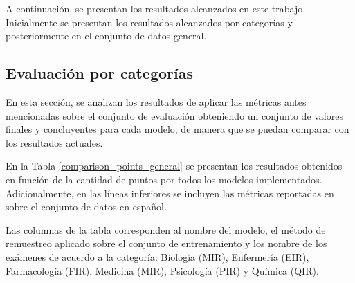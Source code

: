 A continuación, se presentan los resultados alcanzados en este trabajo. Inicialmente se presentan los resultados alcanzados por categorías y posteriormente en el conjunto de datos general.

\subsection{Evaluación por categorías}

En esta sección, se analizan los resultados de aplicar las métricas antes mencionadas sobre el conjunto de evaluación obteniendo un conjunto de valores finales y concluyentes para cada modelo, de manera que se puedan comparar con los resultados actuales. 

En la Tabla \ref{comparison_points_general} se presentan los resultados obtenidos en función de la cantidad de puntos por todos los modelos implementados. Adicionalmente, en las líneas inferiores se incluyen las métricas reportadas en \cite{2019-head-qa} sobre el conjunto de datos en español. 

Las columnas de la tabla corresponden al nombre del modelo, el método de remuestreo aplicado sobre el conjunto de entrenamiento y los nombre de los exámenes de acuerdo a la categoría: Biología (MIR), Enfermería (EIR), Farmacología (FIR), Medicina (MIR), Psicología (PIR) y Química (QIR). 

